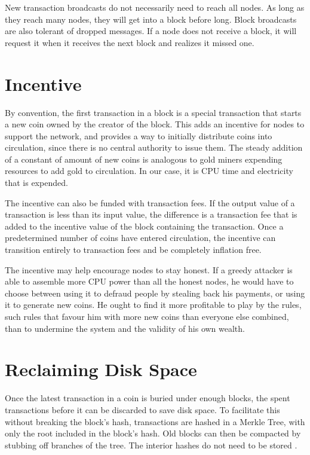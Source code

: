 New transaction broadcasts do not necessarily need to reach all nodes. As long as they reach many nodes, they will get into a block before long. Block broadcasts are also tolerant of dropped messages. If a node does not receive a block, it will request it when it receives the next block and realizes it missed one.

\section{Incentive}

By convention, the first transaction in a block is a special transaction that starts a new coin owned by the creator of the block. This adds an incentive for nodes to support the network, and provides a way to initially distribute coins into circulation, since there is no central authority to issue them. The steady addition of a constant of amount of new coins is analogous to gold miners expending resources to add gold to circulation. In our case, it is CPU time and electricity that is expended.

The incentive can also be funded with transaction fees. If the output value of a transaction is less than its input value, the difference is a transaction fee that is added to the incentive value of the block containing the transaction. Once a predetermined number of coins have entered circulation, the incentive can transition entirely to transaction fees and be completely inflation free\cite{nakamoto2012bitcoin}\cite{grinberg2012bitcoin}.

The incentive may help encourage nodes to stay honest. If a greedy attacker is able to assemble more CPU power than all the honest nodes, he would have to choose between using it to defraud people by stealing back his payments, or using it to generate new coins. He ought to find it more profitable to play by the rules, such rules that favour him with more new coins than everyone else combined, than to undermine the system and the validity of his own wealth.

\section{Reclaiming Disk Space}

Once the latest transaction in a coin is buried under enough blocks, the spent transactions before it can be discarded to save disk space. To facilitate this without breaking the block's hash, transactions are hashed in a Merkle Tree, with only the root included in the block's hash. Old blocks can then be compacted by stubbing off branches of the tree. The interior hashes do not need to be stored \cite{nakamoto2012bitcoin}.

